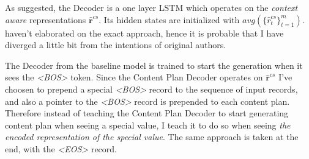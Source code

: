 As suggested, the Decoder is a one layer LSTM which operates on the \emph{context aware} representations $\hat{\mathbf{r}}^{cs}$. Its hidden states are initialized with $avg(\{\hat{r}_t^{cs}\}_{t=1}^m)$. \citep{puduppully2019datatotext} haven't elaborated on the exact approach, hence it is probable that I have diverged a little bit from the intentions of original authors.

The Decoder from the baseline model is trained to start the generation when it sees the \emph{\textless BOS\textgreater} token. Since the Content Plan Decoder operates on $\hat{\mathbf{r}}^{cs}$ I've choosen to prepend a special \emph{\textless BOS\textgreater} record to the sequence of input records, and also a pointer to the \emph{\textless BOS\textgreater} record is prepended to each content plan. Therefore instead of teaching the Content Plan Decoder to start generating content plan when seeing a special value, I teach it to do so when seeing \emph{the encoded representation of the special value}. The same approach is taken at the end, with the \emph{\textless EOS\textgreater} record.

